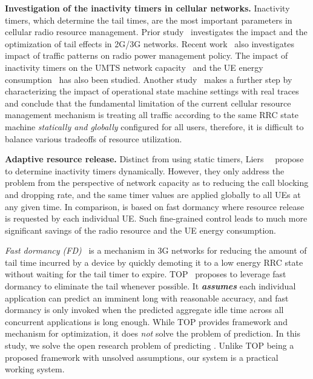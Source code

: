 \textbf{Investigation of the inactivity timers in cellular networks.} Inactivity timers, which determine the tail times, are the most important parameters in cellular radio resource management. Prior study~\cite{imc.tailender} investigates the impact and the optimization of tail effects in 2G/3G networks. Recent work~\cite{falaki10_imc} also investigates impact of traffic patterns on radio power management policy. The impact of inactivity timers on the UMTS network capacity~\cite{Chuah:Impacts:WCNC2002} and the UE energy consumption~\cite{Lee:Impact:WTS2004, Yeh:Energy:ITVT2009} has also been studied. Another study~\cite{imc.3g} makes a further step by characterizing the impact of operational state machine settings with real traces and conclude that the fundamental limitation of the current cellular resource management mechanism is treating all traffic according to the same RRC state machine \emph{statically and globally} configured for all users, therefore, it is difficult to balance various tradeoffs of resource utilization.

\textbf{Adaptive resource release.}
Distinct from using static timers, Liers~\etal~\cite{Liers:DynamicTimeout:PIMRC2005} propose to determine inactivity timers dynamically. %
However, they only address the problem from the perspective of network capacity as to reducing the call blocking and dropping rate, and the same timer values are applied globally to all UEs at any given time. In comparison, \NAME is based on fast dormancy where resource release is requested by each individual UE. Such fine-grained control leads to much more significant savings of the radio resource and the UE energy consumption.


{\em  Fast dormancy (FD)}~\cite{fast.dormancy.1, fast.dormancy.2} is a mechanism in 3G networks for reducing the amount of tail time incurred by a device by quickly demoting it to a low energy RRC state without waiting for the tail timer to expire. TOP~\cite{qian10_icnp} proposes to leverage fast dormancy to eliminate the tail whenever possible. It {\em \bf assumes} each individual application can predict an imminent long \IBT with reasonable accuracy, and fast dormancy is only invoked when the predicted aggregate idle time across all concurrent applications is long enough. While TOP provides framework and mechanism for optimization, it does {\em not} solve the problem of prediction. In this study, we solve the open research problem of predicting \IBTS. Unlike TOP being a proposed framework with unsolved assumptions, our system \NAME is a practical working system.

